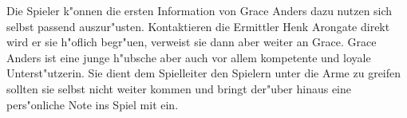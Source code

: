 \begin{remarks}
	Die Spieler k"onnen die ersten Information von Grace Anders dazu nutzen sich selbst passend auszur"usten. Kontaktieren die Ermittler Henk Arongate direkt wird er sie h"oflich begr"u\3en, verweist sie dann aber weiter an Grace. Grace Anders ist eine junge h"ubsche aber auch vor allem kompetente und loyale Unterst"utzerin. Sie dient dem Spielleiter den Spielern unter die Arme zu greifen sollten sie selbst nicht weiter kommen und bringt der"uber hinaus eine pers"onliche Note ins Spiel mit ein.
\end{remarks}
